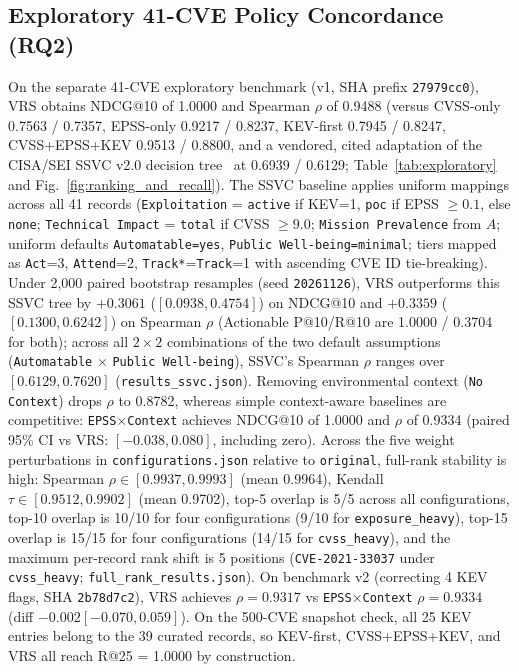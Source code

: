 \documentclass[conference]{IEEEtran}
\begin{document}
\subsection{Exploratory 41-CVE Policy Concordance (RQ2)}
On the separate 41-CVE exploratory benchmark (v1, SHA prefix \texttt{27979cc0}), VRS obtains NDCG@10 of 1.0000 and Spearman $\rho$ of 0.9488 (versus CVSS-only 0.7563 / 0.7357, EPSS-only 0.9217 / 0.8237, KEV-first 0.7945 / 0.8247, CVSS+EPSS+KEV 0.9513 / 0.8800, and a vendored, cited adaptation of the CISA/SEI SSVC v2.0 decision tree~\cite{spring2020ssvc, cisa2024ssvc} at 0.6939 / 0.6129; Table~\ref{tab:exploratory} and Fig.~\ref{fig:ranking_and_recall}). The SSVC baseline applies uniform mappings across all 41 records (\texttt{Exploitation} = \texttt{active} if KEV=1, \texttt{poc} if EPSS $\ge 0.1$, else \texttt{none}; \texttt{Technical Impact} = \texttt{total} if CVSS $\ge 9.0$; \texttt{Mission Prevalence} from $A$; uniform defaults \texttt{Automatable=yes}, \texttt{Public Well-being=minimal}; tiers mapped as \texttt{Act}=3, \texttt{Attend}=2, \texttt{Track*}=\texttt{Track}=1 with ascending CVE ID tie-breaking). Under 2{,}000 paired bootstrap resamples (seed \texttt{20261126}), VRS outperforms this SSVC tree by $+0.3061$ ($[0.0938, 0.4754]$) on NDCG@10 and $+0.3359$ ($[0.1300, 0.6242]$) on Spearman $\rho$ (Actionable P@10/R@10 are 1.0000 / 0.3704 for both); across all $2\times2$ combinations of the two default assumptions (\texttt{Automatable} $\times$ \texttt{Public Well-being}), SSVC's Spearman $\rho$ ranges over $[0.6129, 0.7620]$ (\texttt{results\_ssvc.json}). Removing environmental context (\texttt{No Context}) drops $\rho$ to 0.8782, whereas simple context-aware baselines are competitive: \texttt{EPSS$\times$Context} achieves NDCG@10 of 1.0000 and $\rho$ of 0.9334 (paired 95\% CI vs VRS: $[-0.038, 0.080]$, including zero). Across the five weight perturbations in \texttt{configurations.json} relative to \texttt{original}, full-rank stability is high: Spearman $\rho \in [0.9937, 0.9993]$ (mean 0.9964), Kendall $\tau \in [0.9512, 0.9902]$ (mean 0.9702), top-5 overlap is 5/5 across all configurations, top-10 overlap is 10/10 for four configurations (9/10 for \texttt{exposure\_heavy}), top-15 overlap is 15/15 for four configurations (14/15 for \texttt{cvss\_heavy}), and the maximum per-record rank shift is 5 positions (\texttt{CVE-2021-33037} under \texttt{cvss\_heavy}; \texttt{full\_rank\_results.json}). On benchmark v2 (correcting 4 KEV flags, SHA \texttt{2b78d7c2}), VRS achieves $\rho = 0.9317$ vs \texttt{EPSS$\times$Context} $\rho = 0.9334$ (diff $-0.002 [-0.070, 0.059]$). On the 500-CVE snapshot check, all 25 KEV entries belong to the 39 curated records, so KEV-first, CVSS+EPSS+KEV, and VRS all reach R@25 = 1.0000 by construction.
\end{document}
